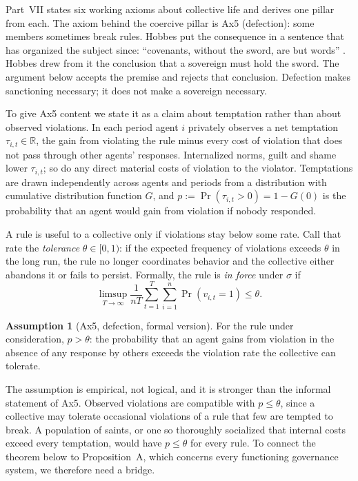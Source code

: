 \documentclass[11pt,letterpaper]{article}
\theoremstyle{definition}
\newtheorem{assumption}[theorem]{Assumption}
\theoremstyle{remark}
\renewcommand{\Pr}{\operatorname{Pr}}
\begin{document}
Part~VII states six working axioms about collective life and derives one pillar from each. The axiom behind the coercive pillar is Ax5 (defection): some members sometimes break rules. Hobbes put the consequence in a sentence that has organized the subject since: ``covenants, without the sword, are but words'' \citep[ch.~17]{hobbes1651}. Hobbes drew from it the conclusion that a sovereign must hold the sword. The argument below accepts the premise and rejects that conclusion. Defection makes sanctioning necessary; it does not make a sovereign necessary.

To give Ax5 content we state it as a claim about temptation rather than about observed violations. In each period agent $i$ privately observes a net temptation $\tau_{i,t} \in \mathbb{R}$, the gain from violating the rule minus every cost of violation that does not pass through other agents' responses. Internalized norms, guilt and shame lower $\tau_{i,t}$; so do any direct material costs of violation to the violator. Temptations are drawn independently across agents and periods from a distribution with cumulative distribution function $G$, and $p := \Pr(\tau_{i,t} > 0) = 1 - G(0)$ is the probability that an agent would gain from violation if nobody responded.

A rule is useful to a collective only if violations stay below some rate. Call that rate the \emph{tolerance} $\theta \in [0,1)$: if the expected frequency of violations exceeds $\theta$ in the long run, the rule no longer coordinates behavior and the collective either abandons it or fails to persist. Formally, the rule is \emph{in force} under $\sigma$ if
\[
\limsup_{T \to \infty} \frac{1}{nT} \sum_{t=1}^{T} \sum_{i=1}^{n} \Pr(v_{i,t} = 1) \le \theta .
\]

\begin{assumption}[Ax5, defection, formal version]
\label{ass:ax5}
For the rule under consideration, $p > \theta$: the probability that an agent gains from violation in the absence of any response by others exceeds the violation rate the collective can tolerate.
\end{assumption}

The assumption is empirical, not logical, and it is stronger than the informal statement of Ax5. Observed violations are compatible with $p \le \theta$, since a collective may tolerate occasional violations of a rule that few are tempted to break. A population of saints, or one so thoroughly socialized that internal costs exceed every temptation, would have $p \le \theta$ for every rule. To connect the theorem below to Proposition~A, which concerns every functioning governance system, we therefore need a bridge.
\end{document}
